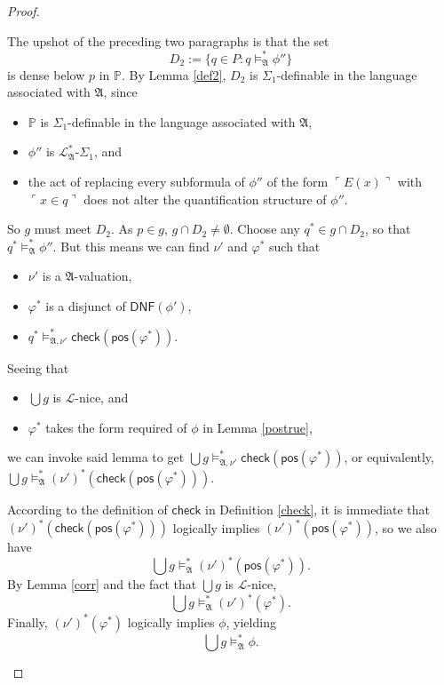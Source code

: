 \documentclass[12pt]{article}
\numberwithin{equation}{section}
\begin{document}
\begin{proof}
\begin{enumerate}[label=Case \arabic*:, leftmargin=50pt]
    The upshot of the preceding two paragraphs is that the set $$D_2 := \{q \in P : q \models^{*}_{\mathfrak{A}} \phi''\}$$ is dense below $p$ in $\mathbb{P}$. By Lemma \ref{def2}, $D_2$ is $\Sigma_1$-definable in the language associated with $\mathfrak{A}$, since 
    \begin{itemize}
        \item $\mathbb{P}$ is $\Sigma_1$-definable in the language associated with $\mathfrak{A}$,
        \item $\phi''$ is $\mathcal{L}^{*}_{\mathfrak{A}}$-$\Sigma_1$, and
        \item the act of replacing every subformula of $\phi''$ of the form $\ulcorner E(x) \urcorner$ with $\ulcorner x \in q \urcorner$ does not alter the quantification structure of $\phi''$.
    \end{itemize}
    So $g$ must meet $D_2$. As $p \in g$, $g \cap D_2 \neq \emptyset$. Choose any $q^* \in g \cap D_2$, so that $q^* \models^{*}_{\mathfrak{A}} \phi''$. But this means we can find $\nu'$ and $\varphi^*$ such that
    \begin{itemize}
        \item $\nu'$ is a $\mathfrak{A}$-valuation, 
        \item $\varphi^*$ is a disjunct of $\mathsf{DNF}(\phi')$,
        \item $q^* \models^{*}_{\mathfrak{A}, \nu'} \mathsf{check}(\mathsf{pos}(\varphi^*))$.
    \end{itemize}
    Seeing that 
    \begin{itemize}
        \item $\bigcup g$ is $\mathcal{L}$-nice, and
        \item $\varphi^*$ takes the form required of $\phi$ in Lemma \ref{postrue}, 
    \end{itemize}
    we can invoke said lemma to get $\bigcup g \models^{*}_{\mathfrak{A}, \nu'} \mathsf{check}(\mathsf{pos}(\varphi^*))$, or equivalently, $\bigcup g \models^{*}_{\mathfrak{A}} (\nu')^*(\mathsf{check}(\mathsf{pos}(\varphi^*)))$.

    According to the definition of $\mathsf{check}$ in Definition \ref{check}, it is immediate that $(\nu')^*(\mathsf{check}(\mathsf{pos}(\varphi^*)))$ logically implies $(\nu')^*(\mathsf{pos}(\varphi^*))$, so we also have $$\bigcup g \models^{*}_{\mathfrak{A}} (\nu')^*(\mathsf{pos}(\varphi^*)).$$ By Lemma \ref{corr} and the fact that $\bigcup g$ is $\mathcal{L}$-nice, $$\bigcup g \models^{*}_{\mathfrak{A}} (\nu')^*(\varphi^*).$$ Finally, $(\nu')^*(\varphi^*)$ logically implies $\phi$, yielding $$\bigcup g \models^{*}_{\mathfrak{A}} \phi.$$
    

\end{enumerate}
\end{proof}
\end{document}
